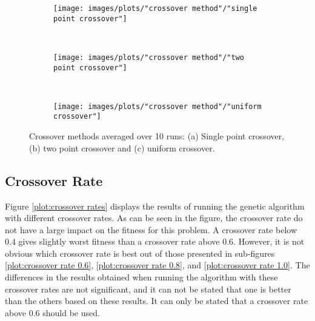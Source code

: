 \begin{figure}[h!]
    \centering
    \begin{subfigure}[b]{0.31\textwidth}
        \texttt{[image: images/plots/"crossover method"/"single point crossover"]}
        \caption{}
        \hfill
        \label{plot:single point crossover}
    \end{subfigure}
    ~
    \begin{subfigure}[b]{0.31\textwidth}
        \texttt{[image: images/plots/"crossover method"/"two point crossover"]}
        \caption{}
        \hfill
        \label{plot:two point crossover}
    \end{subfigure}
    ~
    \begin{subfigure}[b]{0.31\textwidth}
        \texttt{[image: images/plots/"crossover method"/"uniform crossover"]}
        \caption{}
        \hfill
        \label{plot:uniform crossover}
    \end{subfigure}
    \caption{Crossover methods averaged over 10 runs: (a) Single point crossover, (b) two point crossover and (c) uniform crossover.}
    \label{plot:crossover methods}
\end{figure}


\subsection{Crossover Rate}
Figure \ref{plot:crossover rates} displays the results of running the genetic algorithm with different crossover rates. As can be seen in the figure, the crossover rate do not have a large impact on the fitness for this problem. A crossover rate below 0.4 gives slightly worst fitness than a crossover rate above 0.6. However, it is not obvious which crossover rate is best out of those presented in sub-figures \ref{plot:crossover rate 0.6}, \ref{plot:crossover rate 0.8}, and \ref{plot:crossover rate 1.0}. The differences in the results obtained when running the algorithm with these crossover rates are not significant, and it can not be stated that one is better than the others based on these results. It can only be stated that a crossover rate above 0.6 should be used. \\



